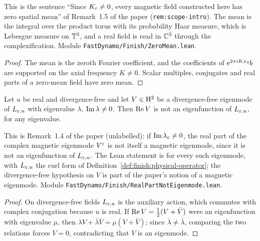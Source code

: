 This is the sentence ``Since $K_\varepsilon\neq0$, every magnetic field constructed here has zero
spatial mean'' of Remark~1.5 of the paper (\texttt{rem:scope-intro}).  The mean is the integral
over the product torus with its probability Haar measure, which is Lebesgue measure on $\mathbb{T}^3$,
and a real field is read in $\mathbb{C}^3$ through the complexification.  Module
\texttt{FastDynamo/Finish/ZeroMean.lean}.

\begin{proof}
  \leanok
  The mean is the zeroth Fourier coefficient, and the coefficients of $\mathrm{e}^{2\pi iKx_3}b$ are
  supported on the axial frequency $K\neq0$.  Scalar multiples, conjugates and real parts of a
  zero-mean field have zero mean.
\end{proof}

\begin{lemma}
  \label{lem:finish:real-part-not-eigenmode}
  \leanok
  Let $u$ be real and divergence-free and let $V\in\mathrm{H}^2$ be a divergence-free eigenmode of
  $L_{\varepsilon,u}$ with eigenvalue $\lambda$, $\operatorname{Im}\lambda\neq0$.  Then $\operatorname{Re} V$ is not an
  eigenfunction of $L_{\varepsilon,u}$, for any eigenvalue.
\end{lemma}

This is Remark~1.4 of the paper (unlabelled): if $\operatorname{Im}\lambda_\varepsilon\neq0$, the real part of the
complex magnetic eigenmode $V^\varepsilon$ is not itself a magnetic eigenmode, since it is not an
eigenfunction of $L_{\varepsilon,u}$.  The Lean statement is for every such eigenmode, with
$L_{\varepsilon,u}$ the curl form of Definition~\ref{def:finish:physical-operator}; the divergence-free
hypothesis on $V$ is part of the paper's notion of a magnetic eigenmode.  Module
\texttt{FastDynamo/Finish/RealPartNotEigenmode.lean}.

\begin{proof}
  \leanok
  On divergence-free fields $L_{\varepsilon,u}$ is the auxiliary action, which commutes with complex
  conjugation because $u$ is real.  If $\operatorname{Re} V=\frac12(V+\bar V)$ were an eigenfunction with
  eigenvalue $\mu$, then $\lambda V+\bar\lambda\bar V=\mu(V+\bar V)$; since
  $\lambda\neq\bar\lambda$, comparing the two relations forces $V=0$, contradicting that $V$
  is an eigenmode.
\end{proof}

